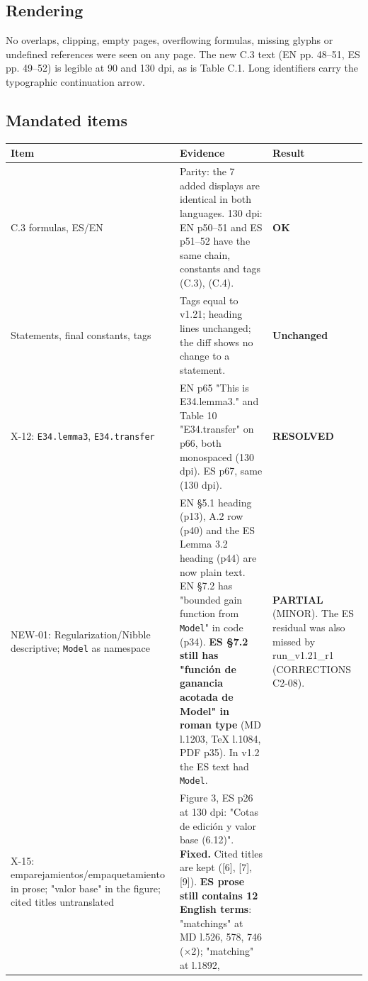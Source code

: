 \documentclass[
]{article}
\newcounter{none} %
\begin{document}
\subsection{Rendering}\label{rendering}

No overlaps, clipping, empty pages, overflowing formulas, missing glyphs
or undefined references were seen on any page. The new C.3 text (EN pp.
48--51, ES pp. 49--52) is legible at 90 and 130 dpi, as is Table C.1.
Long identifiers carry the typographic continuation arrow.

\subsection{Mandated items}\label{mandated-items}

{\def\LTcaptype{none} %
\begin{longtable}[]{@{}lll@{}}
\toprule\noalign{}
Item & Evidence & Result \\
\midrule\noalign{}
\endhead
\bottomrule\noalign{}
\endlastfoot
C.3 formulas, ES/EN & Parity: the 7 added displays are identical in both
languages. 130 dpi: EN p50--51 and ES p51--52 have the same chain,
constants and tags (C.3), (C.4). & \textbf{OK} \\
Statements, final constants, tags & Tags equal to v1.21; heading lines
unchanged; the diff shows no change to a statement. &
\textbf{Unchanged} \\
X-12: \texttt{E34.lemma3}, \texttt{E34.transfer} & EN p65 "This is
E34.lemma3." and Table 10 "E34.transfer" on p66, both monospaced (130
dpi). ES p67, same (130 dpi). & \textbf{RESOLVED} \\
NEW-01: Regularization/Nibble descriptive; \texttt{Model} as namespace &
EN §5.1 heading (p13), A.2 row (p40) and the ES Lemma 3.2 heading (p44)
are now plain text. EN §7.2 has "bounded gain function from
\texttt{Model}" in code (p34). \textbf{ES §7.2 still has "función de
ganancia acotada de Model" in roman type} (MD l.1203, TeX l.1084, PDF
p35). In v1.2 the ES text had
\texttt{\textasciigrave{}Model\textasciigrave{}}. & \textbf{PARTIAL}
(MINOR). The ES residual was also missed by run\_v1.21\_r1 (CORRECTIONS
C2-08). \\
X-15: emparejamientos/empaquetamiento in prose; "valor base" in the
figure; cited titles untranslated & Figure 3, ES p26 at 130 dpi: "Cotas
de edición y valor base (6.12)". \textbf{Fixed.} Cited titles are kept
({[}6{]}, {[}7{]}, {[}9{]}). \textbf{ES prose still contains 12 English
terms}: "matchings" at MD l.526, 578, 746 (×2); "matching" at l.1892,

\end{longtable}}
\end{document}
